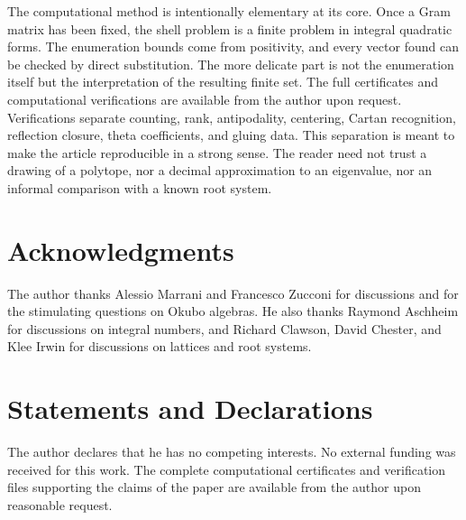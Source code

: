 \documentclass{birkjour}
\numberwithin{equation}{section}
\begin{document}
The computational method is intentionally elementary at its core. Once a Gram
matrix has been fixed, the shell problem is a finite problem in integral
quadratic forms. The enumeration bounds come from positivity, and every vector
found can be checked by direct substitution. The more delicate part is not the
enumeration itself but the interpretation of the resulting finite set. The full certificates and computational verifications are
available from the author upon request. Verifications separate counting, rank, antipodality, centering,
Cartan recognition, reflection closure, theta coefficients, and gluing data. This separation is meant to make the article reproducible in a strong sense.
The reader need not trust a drawing of a polytope, nor a decimal approximation
to an eigenvalue, nor an informal comparison with a known root system. 

\section*{Acknowledgments}

The author thanks Alessio Marrani and Francesco Zucconi for discussions and
for the stimulating questions on Okubo algebras. He also thanks Raymond
Aschheim for discussions on integral numbers, and Richard Clawson, David
Chester, and Klee Irwin for discussions on lattices and root systems.

\section*{Statements and Declarations}

The author declares that he has no competing interests. No external funding was
received for this work. The complete computational certificates and
verification files supporting the claims of the paper are available from the
author upon reasonable request.
\end{document}
